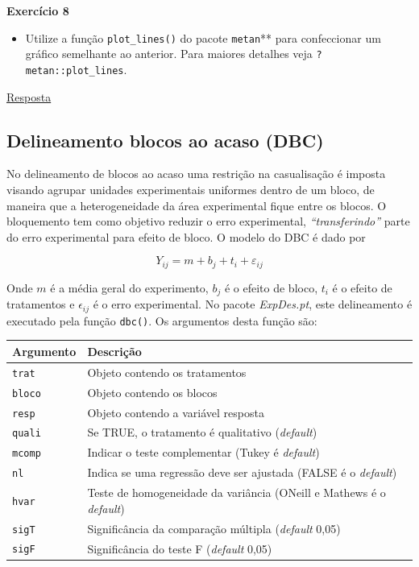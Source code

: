 \documentclass[
]{book}
\providecommand{\tightlist}{%
  \setlength{\itemsep}{0pt}\setlength{\parskip}{0pt}}
\begin{document}
\begin{tarefa}
\textbf{Exercício 8}

\begin{itemize}
\tightlist
\item
  Utilize a função \texttt{plot\_lines()} do pacote \texttt{metan}** para confeccionar um gráfico semelhante ao anterior. Para maiores detalhes veja \texttt{?metan::plot\_lines}.
\end{itemize}
\end{tarefa}

\protect\hyperlink{exerc8}{Resposta}


\hypertarget{delineamento-blocos-ao-acaso-dbc}{%
\subsection{Delineamento blocos ao acaso (DBC)}\label{delineamento-blocos-ao-acaso-dbc}}


No delineamento de blocos ao acaso uma restrição  na casualisação é imposta visando agrupar unidades experimentais uniformes dentro de um bloco, de maneira que a heterogeneidade da área experimental fique entre os blocos. O bloquemento tem como objetivo reduzir o erro experimental, \emph{``transferindo''} parte do erro experimental para efeito de bloco. O modelo do DBC é dado por

\[
{Y_{ij}} = m + {b_j} + {t_i} + {\varepsilon _{ij}}
\]

Onde \(m\) é a média geral do experimento, \(b_j\) é o efeito de bloco, \(t_i\) é o efeito de tratamentos e \(\epsilon_{ij}\) é o erro experimental. No pacote \emph{ExpDes.pt}, este delineamento é executado pela função \texttt{dbc()}. Os argumentos desta função são:

\begin{longtable}[]{@{}ll@{}}
\toprule
Argumento & Descrição\tabularnewline
\midrule
\endhead
\texttt{trat} & Objeto contendo os tratamentos\tabularnewline
\texttt{bloco} & Objeto contendo os blocos\tabularnewline
\texttt{resp} & Objeto contendo a variável resposta\tabularnewline
\texttt{quali} & Se TRUE, o tratamento é qualitativo (\emph{default})\tabularnewline
\texttt{mcomp} & Indicar o teste complementar (Tukey é \emph{default})\tabularnewline
\texttt{nl} & Indica se uma regressão deve ser ajustada (FALSE é o \emph{default})\tabularnewline
\texttt{hvar} & Teste de homogeneidade da variância (ONeill e Mathews é o \emph{default})\tabularnewline
\texttt{sigT} & Significância da comparação múltipla (\emph{default} 0,05)\tabularnewline
\texttt{sigF} & Significância do teste F (\emph{default} 0,05)\tabularnewline
\bottomrule
\end{longtable}
\end{document}
